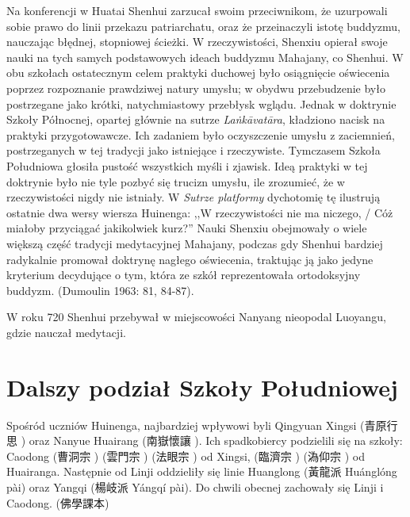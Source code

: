 Na konferencji w Huatai Shenhui zarzucał swoim przeciwnikom, że uzurpowali sobie prawo do linii przekazu patriarchatu, oraz że przeinaczyli istotę buddyzmu, nauczając błędnej, stopniowej ścieżki.
W rzeczywistości, Shenxiu opierał swoje nauki na tych samych podstawowych ideach buddyzmu Mahajany, co Shenhui.
W obu szkołach ostatecznym celem praktyki duchowej było osiągnięcie oświecenia poprzez rozpoznanie prawdziwej natury umysłu; w obydwu przebudzenie było postrzegane jako krótki, natychmiastowy przebłysk wglądu.
Jednak w doktrynie Szkoły Północnej, opartej głównie na sutrze \textit{La\.nkā\-vatāra}, kładziono nacisk na praktyki przygotowawcze.
Ich zadaniem było oczyszczenie umysłu z zaciemnień, postrzeganych w tej tradycji jako istniejące i rzeczywiste.
Tymczasem Szkoła Południowa głosiła pustość wszystkich myśli i zjawisk.
Ideą praktyki w tej doktrynie było nie tyle pozbyć się trucizn umysłu, ile zrozumieć, że w rzeczywistości nigdy nie istniały.
W \textit{Sutrze platformy} dychotomię tę ilustrują ostatnie dwa wersy wiersza Huinenga: ,,W rzeczywistości nie ma niczego, / Cóż miałoby przyciągać jakikolwiek kurz?''
Nauki Shenxiu obejmowały o wiele większą część tradycji medytacyjnej Mahajany, podczas gdy Shenhui bardziej radykalnie promował doktrynę nagłego oświecenia, traktując ją jako jedyne kryterium decydujące o tym, która ze szkół reprezentowała ortodoksyjny buddyzm.
(Dumoulin 1963: 81, 84-87). %

W roku 720 Shenhui przebywał w miejscowości Nanyang nieopodal Luoyangu, gdzie nauczał medytacji.

\section{Dalszy podział Szkoły Południowej}
Spośród uczniów Huinenga, najbardziej wpływowi byli Qingyuan Xingsi (青原行思 ) oraz Nanyue Huairang (南嶽懷讓 ).
Ich spadkobiercy podzielili się na szkoły: Caodong (曹洞宗 ) (雲門宗 ) (法眼宗 ) od Xingsi, (臨濟宗 ) (溈仰宗 ) od Huairanga.
Następnie od Linji oddzieliły się linie Huanglong (黃龍派 Huánglóng pài) oraz Yangqi (楊岐派 Yángqí pài). Do chwili obecnej zachowały się Linji i Caodong. (佛學課本)

